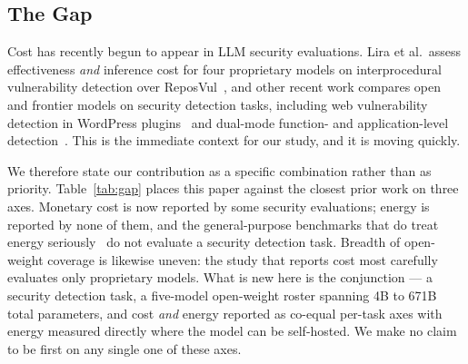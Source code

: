 \documentclass[computers,article,submit,moreauthors]{Definitions/mdpi}
\begin{document}
\subsection{The Gap}\label{sec:gap}
Cost has recently begun to appear in LLM security evaluations. Lira et al.\ assess effectiveness \emph{and} inference cost for four proprietary models on interprocedural vulnerability detection over ReposVul~\citep{lira}, and other recent work compares open and frontier models on security detection tasks, including web vulnerability detection in WordPress plugins~\citep{neef} and dual-mode function- and application-level detection~\citep{dahiya}. This is the immediate context for our study, and it is moving quickly.

We therefore state our contribution as a specific combination rather than as priority. Table~\ref{tab:gap} places this paper against the closest prior work on three axes. Monetary cost is now reported by some security evaluations; energy is reported by none of them, and the general-purpose benchmarks that do treat energy seriously~\citep{helm,tokenpowerbench,jegham,luccioni} do not evaluate a security detection task. Breadth of open-weight coverage is likewise uneven: the study that reports cost most carefully evaluates only proprietary models. What is new here is the conjunction --- a security detection task, a five-model open-weight roster spanning 4B to 671B total parameters, and cost \emph{and} energy reported as co-equal per-task axes with energy measured directly where the model can be self-hosted. We make no claim to be first on any single one of these axes.
\end{document}
